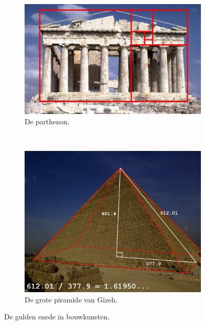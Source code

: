\documentclass{article}
\begin{document}
\begin{figure}[Hh]
    \centering
    \begin{subfigure}[b]{0.5\textwidth}
        \includegraphics[width=\textwidth]{gold08.jpg}
		\caption{De parthenon.}
		\label{fig:parthenon}
    \end{subfigure}%
    ~ 
    \begin{subfigure}[b]{0.5\textwidth}
        \includegraphics[width=\textwidth]{pyramid.jpg}
        \caption{De grote piramide van Gizeh.}
        \label{fig:gizeh}
    \end{subfigure}
    
    \caption{De gulden snede in bouwkunsten.}
    \label{fig:animals}
\end{figure}

\end{document}
